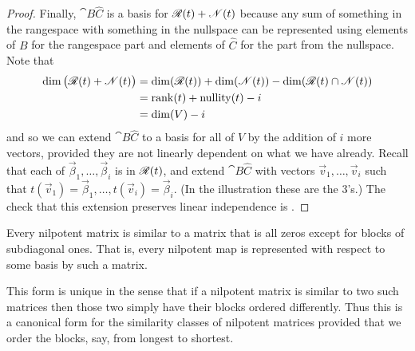 \begin{proof}
Finally, \( \cat{B}{\hat{C}} \)
is a basis for \( \mathscr{R}(t)+\mathscr{N}(t) \)
because any sum of something in the rangespace with something in the nullspace
can be represented using elements of \( B \) for the rangespace 
part and elements of \( \hat{C} \) for the part from the nullspace.
Note that
\begin{align*}
  \dim\big(\mathscr{R}(t)+\mathscr{N}(t)\big)
  &=
  \dim (\mathscr{R}(t))+\dim (\mathscr{N}(t))
    -\dim(\mathscr{R}(t)\cap\mathscr{N}(t))  \\
  &=
  \operatorname{rank} (t)+\operatorname{nullity} (t)-i          \\
  &=
  \dim (V)-i
\end{align*}
and so we can extend \( \cat{B}{\hat{C}} \) to a basis for all of 
\( V \) by the addition of \( i \) more vectors, 
provided they are not linearly dependent on what we have already.
Recall that each of \( \vec{\beta}_1,\dots,\vec{\beta}_i \) is
in \( \mathscr{R}(t) \), and extend \( \cat{B}{\hat{C}} \) with vectors
\( \vec{v}_1,\dots,\vec{v}_i \) such that
\( t(\vec{v}_1)=\vec{\beta}_1,\dots,t(\vec{v}_i)=\vec{\beta}_i \).
(In the illustration these are the \( 3 \)'s.)
The check that this extension preserves linear independence is
.
\end{proof}

\begin{corollary} \label{cor:NilpotentMatCanonForm}
Every nilpotent matrix is similar to a matrix that is all zeros
except for blocks of subdiagonal ones.
That is, every nilpotent map is represented with respect to some basis by
such a matrix.
\end{corollary}

This form is unique in the sense that if a nilpotent matrix is similar to two
such matrices then those two simply have their blocks ordered differently.
Thus this is
a canonical form for the similarity classes of nilpotent matrices
provided that we order the blocks, say, from longest to shortest.

